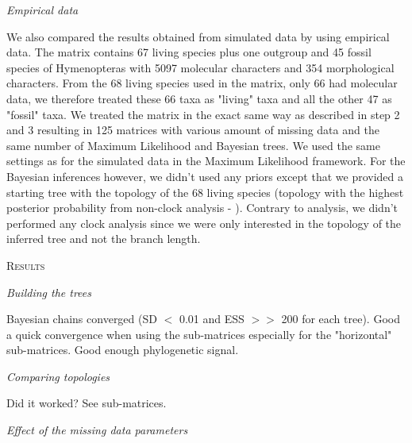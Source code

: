 \documentclass[12pt,letterpaper]{article}
\renewcommand{\section}[1]{%
\bigskip
\begin{center}
\begin{Large}
\normalfont\scshape #1
\medskip
\end{Large}
\end{center}}
\renewcommand{\subsection}[1]{%
\bigskip
\begin{center}
\begin{large}
\normalfont\itshape #1
\end{large}
\end{center}}
\begin{document}
\subsection{Empirical data} %
We also compared the results obtained from simulated data by using \citet{ronquista2012} empirical data.
The matrix contains 67 living species plus one outgroup and 45 fossil species of Hymenopteras with 5097 molecular characters and 354 morphological characters.
From the 68 living species used in the matrix, only 66 had molecular data, we therefore treated these 66 taxa as "living" taxa and all the other 47 as "fossil" taxa.
We treated the matrix in the exact same way as described in step 2 and 3 resulting in 125 matrices with various amount of missing data and the same number of Maximum Likelihood and Bayesian trees.
We used the same settings as for the simulated data in the Maximum Likelihood framework.
For the Bayesian inferences however, we didn’t used any priors except that we provided a starting tree with the topology of the 68 living species (topology with the highest posterior probability from non-clock analysis - \citet{ronquista2012}).
Contrary to \citet{ronquista2012} analysis, we didn’t performed any clock analysis since we were only interested in the topology of the inferred tree and not the branch length.


%
%


\section{Results}
\subsection{Building the trees}
Bayesian chains converged (SD $<$ 0.01 and ESS $>>$ 200 for each tree).
Good a quick convergence when using the sub-matrices especially for the "horizontal" sub-matrices.
Good enough phylogenetic signal.

\subsection{Comparing topologies}
Did it worked? See sub-matrices.

\subsection{Effect of the missing data parameters}
\end{document}
